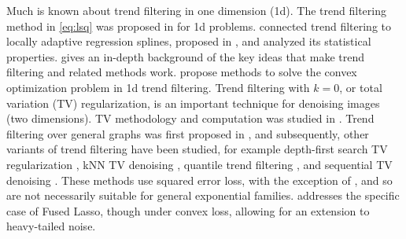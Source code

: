\documentclass[ejs,noshowframe]{imsart}
\theoremstyle{plain}
\theoremstyle{definition}
\begin{document}
Much is known about trend filtering in one dimension (1d). The trend filtering method
in \eqref{eq:lsq} was proposed in \citet{steidl2006splines,KimKoh2009} for 1d problems. 
\cite{tibshirani2014adaptive} connected trend filtering to
locally adaptive regression splines, proposed in \cite{mammen1997locally}, and
analyzed its statistical properties. \cite{tibshirani2020divided} gives an
in-depth background of the key ideas that make trend filtering and related
methods work.
\cite{johnson2013dynamic,KimKoh2009,RamdasTibshirani2016} propose
methods to solve the convex optimization problem in 1d trend filtering.
Trend filtering with $k=0$, or total variation (TV) regularization, is an important technique 
for denoising images (two dimensions). TV methodology and computation was studied in
\citet{rudin1992nonlinear,tibshirani2005sparsity,condat2012direct,barbero2014modular}.
Trend filtering over general graphs was first proposed in \cite{WangSharpnack2016}, and subsequently,
other variants of trend filtering have been studied, for example
depth-first search TV regularization \citep{padilla2018dfs}, kNN TV denoising \citep{madrid2020adaptive}, 
quantile trend filtering \citep{padilla2021risk}, and sequential TV denoising \citep{baby2021optimal}.
These methods use squared error loss, with the exception of \cite{padilla2021risk}, and so are not 
necessarily suitable for general exponential families. \citet{zhang2023element}
addresses the specific case of Fused Lasso, though under convex loss, allowing
for an extension to heavy-tailed noise.
\end{document}
